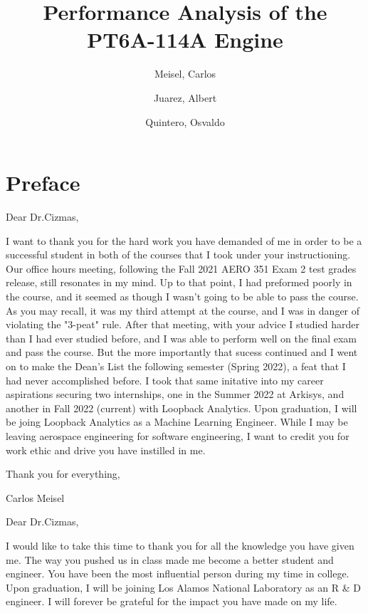 \documentclass[titlepage]{article}
\author{
    Meisel, Carlos \\
  \and
  Juarez, Albert\\
  \and
    Quintero, Osvaldo\\
}
\title{Performance Analysis of the PT6A-114A Engine}
\begin{document}
  \maketitle

  \tableofcontents

  \vspace*{4cm}

    \section{Preface}

    Dear Dr.Cizmas,
    \vspace{0.5cm}

    I want to thank you for the hard work you have demanded of me in order to be a successful student in both of the courses that I took
    under your instructioning. Our office hours meeting, following the Fall 2021 AERO 351 Exam 2 test grades release, still resonates in my mind. 
    Up to that point, I had preformed poorly in the course, and it seemed as though I wasn't going to be able to pass the course. 
    As you may recall, it was my third attempt at the course, and I was in danger of violating the "3-peat" rule. After that meeting, with your advice
    I studied harder than I had ever studied before, and I was able to perform well on the final exam and pass the course. But the more 
    importantly that sucess continued and I went on to make the Dean's List the following semester (Spring 2022), a feat that I had never accomplished before.
    I took that same initative into my career aspirations securing two internships, one in the Summer 2022 at Arkisys, and another in Fall 2022 
    (current) with Loopback Analytics. Upon graduation, I will be joing Loopback Analytics as a Machine Learning Engineer. While I 
    may be leaving aerospace engineering for software engineering, I want to credit you for work ethic and drive you have instilled in me.

    \vspace{0.5cm}

    Thank you for everything, 

    Carlos Meisel

    \vspace{1cm}

    Dear Dr.Cizmas,
    \vspace{0.5cm}

    I would like to take this time to thank you for all the knowledge you have given me. The way you pushed us in class made me become a better student and engineer. You have been the most influential person during my time in college. Upon graduation, I will be joining Los Alamos National Laboratory as an R \& D engineer. I will forever be grateful for the impact you have made on my life.
\end{document}

